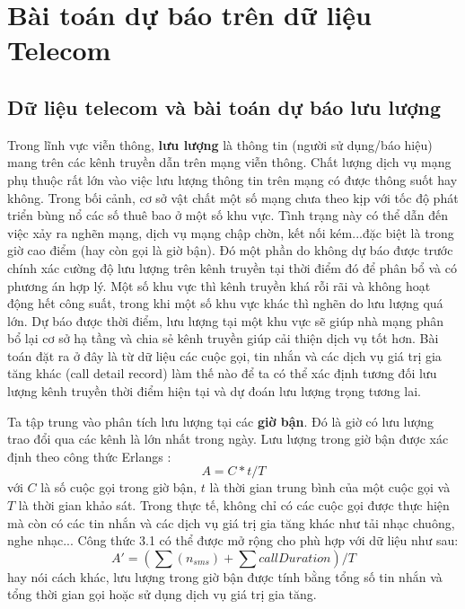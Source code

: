 \chapter{Bài toán dự báo trên dữ liệu Telecom}
\ifpdf
    \graphicspath{{3_experiment/figures/PNG/}{03_experiment/figures/PDF/}{03_experiment/figures/}}
\else
    \graphicspath{{03_experiment/figures/EPS/}{03_experiment/figures/}}
\fi

\section{Dữ liệu telecom và bài toán dự báo lưu lượng}
Trong lĩnh vực viễn thông, \textbf{lưu lượng} là thông tin (người sử dụng/báo hiệu) mang trên các kênh truyền dẫn trên mạng viễn thông. Chất lượng dịch vụ mạng phụ thuộc rất lớn vào việc lưu lượng thông tin trên mạng có được thông suốt hay không. Trong bối cảnh, cơ sở vật chất một số mạng chưa theo kịp với tốc độ phát triển bùng nổ các số thuê bao ở một số khu vực. Tình trạng này có thể dẫn đến việc xảy ra nghẽn mạng, dịch vụ mạng chập chờn, kết nối kém...đặc biệt là trong giờ cao điểm (hay còn gọi là giờ bận). Đó một phần do không dự báo được trước chính xác cường độ lưu lượng trên kênh truyền tại thời điểm đó để phân bổ và có phương án hợp lý. Một số khu vực thì kênh truyền khá rỗi rãi và không hoạt động hết công suất, trong khi một số khu vực khác thì nghẽn do lưu lượng quá lớn. Dự báo được thời điểm, lưu lượng tại một khu vực sẽ giúp nhà mạng phân bổ lại cơ sở hạ tầng và chia sẻ kênh truyền giúp cải thiện dịch vụ tốt hơn. Bài toán đặt ra ở đây là từ dữ liệu các cuộc gọi, tin nhắn và các dịch vụ giá trị gia tăng khác (call detail record) làm thế nào để ta có thể xác định tương đối lưu lượng kênh truyền thời điểm hiện tại và dự đoán lưu lượng trọng tương lai. 

Ta tập trung vào phân tích lưu lượng tại các \textbf{giờ bận}. Đó là giờ có lưu lượng trao đổi qua các kênh là lớn nhất trong ngày. Lưu lượng trong giờ bận được xác định theo công thức Erlangs \citep{flo95}:
\begin{equation}
A = C*t / T
\end{equation}
với $C$ là số cuộc gọi trong giờ bận, $t$ là thời gian trung bình của một cuộc gọi và $T$ là thời gian khảo sát. 
Trong thực tế, không chỉ có các cuộc gọi được thực hiện mà còn có các tin nhắn và các dịch vụ giá trị gia tăng khác như tải nhạc chuông, nghe nhạc... Công thức 3.1 có thể được mở rộng cho phù hợp với dữ liệu như sau:
\begin{equation}
A' = (\sum\limits(n_{sms}) + \sum\limits{callDuration})/T
\end{equation}
hay nói cách khác, lưu lượng trong giờ bận được tính bằng tổng số tin nhắn và tổng thời gian gọi hoặc sử dụng dịch vụ giá trị gia tăng.


